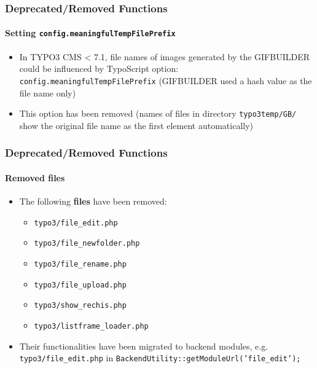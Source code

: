 \begin{frame}[fragile]
	\frametitle{Deprecated/Removed Functions}
	\framesubtitle{Setting \texttt{config.meaningfulTempFilePrefix}}

	\begin{itemize}

		\item In TYPO3 CMS < 7.1, file names of images generated by the GIFBUILDER could be
			influenced by TypoScript option:\newline
			\texttt{config.meaningfulTempFilePrefix}\newline
			\small
				(GIFBUILDER used a hash value as the file name only)
			\normalsize

		\item This option has been removed (names of files in directory \texttt{typo3temp/GB/}
			show the original file name as the first element automatically)

	\end{itemize}

\end{frame}




\begin{frame}[fragile]
	\frametitle{Deprecated/Removed Functions}
	\framesubtitle{Removed files}

	\begin{itemize}
		\item The following \textbf{files} have been removed:

			\begin{itemize}
				\item \texttt{typo3/file\_edit.php}
				\item \texttt{typo3/file\_newfolder.php}
				\item \texttt{typo3/file\_rename.php}
				\item \texttt{typo3/file\_upload.php}
				\item \texttt{typo3/show\_rechis.php}
				\item \texttt{typo3/listframe\_loader.php}
			\end{itemize}

		\item Their functionalities have been migrated to backend modules,
			e.g. \texttt{typo3/file\_edit.php} in \texttt{BackendUtility::getModuleUrl('file\_edit');}

	\end{itemize}

\end{frame}

